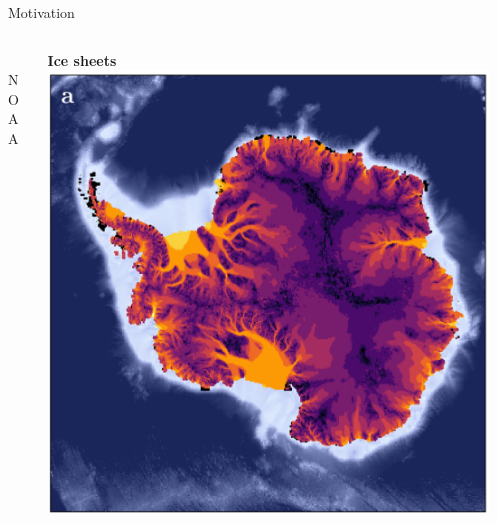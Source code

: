 \documentclass[aspectratio=169,xcolor=dvipsnames]{beamer}
\newcommand\credit[2]{
        \\ \vspace{-0.5em}
        {\color{gray}\scriptsize
        \hfill
        #1
        \hspace{#2}}
        }
\begin{document}
\begin{frame}[t]{Motivation}
\begin{columns}
\begin{column}{0.36\textwidth}
            \credit{NOAA}{3pt}
        \end{column}
        \begin{column}{0.32\textwidth}
            \centering
            \hspace{2em}\textbf{Ice sheets}
            \vspace{0.2cm} \newline
            \includegraphics[width=0.95\textwidth]{figs/Fig-Antarctica-surface-velocity-nolegend.png}
        \end{column}    
    \end{columns}

\hspace{5em}%

\vspace{0.3cm}

\hspace{50pt}
\hspace{10pt}
\hspace{10pt}

\end{frame}
\end{document}
